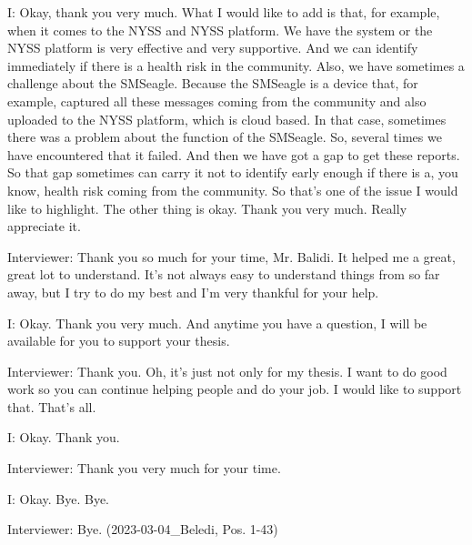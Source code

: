 I: Okay, thank you very much. What I would like to add is that, for example, when it comes to the NYSS and NYSS platform. We have the system or the NYSS platform is very effective and very supportive. And we can identify immediately if there is a health risk in the community. Also, we have sometimes a challenge about the SMSeagle. Because the SMSeagle is a device that, for example, captured all these messages coming from the community and also uploaded to the NYSS platform, which is cloud based. In that case, sometimes there was a problem about the function of the SMSeagle. So, several times we have encountered that it failed. And then we have got a gap to get these reports. So that gap sometimes can carry it not to identify early enough if there is a, you know, health risk coming from the community. So that's one of the issue I would like to highlight. The other thing is okay. Thank you very much. Really appreciate it.

Interviewer:   Thank you so much for your time, Mr. Balidi. It helped me a great, great lot to understand. It's not always easy to understand things from so far away, but I try to do my best and I'm very thankful for your help. 

I: Okay. Thank you very much. And anytime you have a question, I will be available for you to support your thesis.

Interviewer:  Thank you. Oh, it's just not only for my thesis. I want to do good work so you can continue helping people and do your job. I would like to support that. That's all. 

I: Okay. Thank you. 

Interviewer:  Thank you very much for your time. 

I: Okay. Bye. Bye. 

Interviewer:  Bye. (2023-03-04_Beledi, Pos. 1-43)
